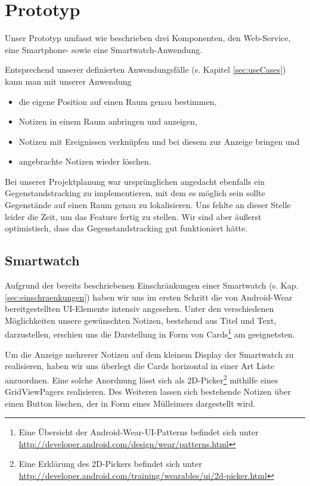 \section{Prototyp}
\label{sec:prototyp}
Unser Prototyp umfasst wie beschrieben drei Komponenten, den Web-Service, eine Smartphone- sowie eine Smartwatch-Anwendung. 

Entsprechend unserer definierten Anwendungsfälle (s. Kapitel \ref{sec:useCases}) kann man mit unserer Anwendung
\begin{itemize}
\item{die eigene Position auf einen Raum genau bestimmen,}
\item{Notizen in einem Raum anbringen und anzeigen,}
\item{Notizen mit Ereignissen verknüpfen und bei diesem zur Anzeige bringen und}
\item{angebrachte Notizen wieder löschen.} 
\end{itemize}

Bei unserer Projektplanung war ursprünglichen angedacht ebenfalls ein Gegenstands\-tracking zu implementieren, mit dem es möglich sein sollte Gegenstände auf einen Raum genau zu lokalisieren. Uns fehlte an dieser Stelle leider die Zeit, um das Feature fertig zu stellen. Wir sind aber äußerst optimistisch, dass das Gegenstandstracking gut funktioniert hätte.

\subsection{Smartwatch}

Aufgrund der bereits beschriebenen Einschränkungen einer Smartwatch (s. Kap. \ref{sec:einschraenkungen}) haben wir uns im ersten Schritt die von Android-Wear bereitgestellten UI-Elemente intensiv angesehen. Unter den verschiedenen Möglichkeiten unsere gewünschten Notizen, bestehend aus Titel und Text, darzustellen, erschien uns die Darstellung in Form von Cards\footnote{Eine Übersicht der Android-Wear-UI-Patterns befindet sich unter \url{http://developer.android.com/design/wear/patterns.html}} am geeignetsten.

Um die Anzeige mehrerer Notizen auf dem kleinem Display der Smartwatch zu realisieren, haben wir uns überlegt die Cards horizontal in einer Art Liste anzuordnen. Eine solche Anordnung lässt sich als 2D-Picker\footnote{Eine Erklärung des 2D-Pickers befindet sich unter  \url{http://developer.android.com/training/wearables/ui/2d-picker.html}} mithilfe eines GridViewPagers realisieren. Des Weiteren lassen sich bestehende Notizen über einen Button löschen, der in Form eines Mülleimers dargestellt wird. 


